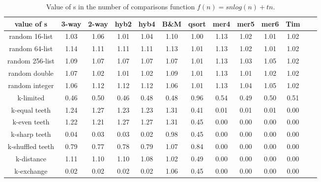 \documentclass[AMA,STIX1COL]{WileyNJD-v2}
\begin{document}
\begin{table}
\caption{Value of s in the number of comparisons function $f(n) = snlog(n) + tn$.}
\centering
\begin{tabular}{|c|c|c|c|c|c|c|c|c|c|c|c|c|}
\toprule
value of s & 3-way & 2-way & hyb2 & hyb4 & B\&M& qsort & mer4 & mer5 & mer6 & Tim \\
\midrule
random 16-list	&1.03&	1.06&	1.01&	1.04&	1.10&	1.00&	1.13&	1.02&	1.01&	1.02\\
random 64-list&1.14	&1.11	&1.11	&1.11	&1.13	&1.01	&1.13	&1.02	&1.01	&1.02\\
random 256-list&	1.09&	1.07&	1.07&	1.07&	1.07&	1.01&	1.13&	1.03&	1.05&	1.02\\
random double&	1.07	&1.02	&1.01	&1.02	&1.09	&1.01	&1.13	&1.01	&1.02	&1.02\\
random integer&	1.06	&1.12&	1.12&	1.12&	1.06&	1.01&	1.13&	1.04&	1.05&	1.02\\
k-limited&	0.46	&0.50	&0.46	&0.48	&0.48	&0.96	&0.54	&0.49	&0.50	&0.51\\
k-equal teeth&	1.24&	1.27&	1.23&	1.23&	1.31&	0.41&	0.01&	0.01&	0.01&	0.00\\
k-even teeth&	1.22	&1.21	&1.27	&1.27	&1.31	&0.45	&0.00	&0.00	&0.00	&0.00\\
k-sharp teeth&	0.04	&0.03&	0.03&	0.02&	0.98&	0.45&	0.00&	0.00	&0.00	&0.00\\
k-shuffled teeth&	0.79	&0.77	&0.78	&0.79	&1.07	&0.84	&0.00	&0.00	&0.00	&0.00\\
k-distance&	1.11	&1.10&	1.10&	1.08&	1.02&	0.49&	0.00&	0.00&	0.00&	0.00\\
k-exchange&	0.02	&0.02	&0.02	&0.02	&1.06	&0.45	&0.00	&0.00	&0.00	&0.00\\
\bottomrule
\end{tabular}
\label{table5}
\end{table}
\end{document}
